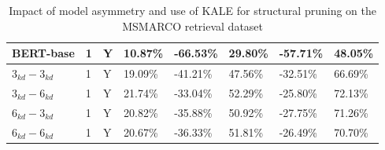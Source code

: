 \begin{table*}[!ht]
\begin{tabular}{|l|l|l|l|l|l|l|l|}
        BERT-base & 1 & Y & 10.87\% & -66.53\% & 29.80\% & -57.71\% & 48.05\% \\ \hline
        $3_{kd}-3_{kd}$ & 1 & Y & 19.09\% & -41.21\% & 47.56\% & -32.51\% & 66.69\% \\ \hline
        $3_{kd}-6_{kd}$ & 1 & Y & 21.74\% & -33.04\% & 52.29\% & -25.80\% & 72.13\% \\ \hline
        $6_{kd}-3_{kd}$ & 1 & Y & 20.82\% & -35.88\% & 50.92\% & -27.75\% & 71.26\% \\ \hline
        $6_{kd}-6_{kd}$ & 1 & Y & 20.67\% & -36.33\% & 51.81\% & -26.49\% & 70.70\% \\ \hline
    \end{tabular}
    \caption{Impact of model asymmetry and use of KALE for structural pruning on the MSMARCO retrieval dataset }
    \label{tab:kale+asym-msmarco}
\end{table*}

